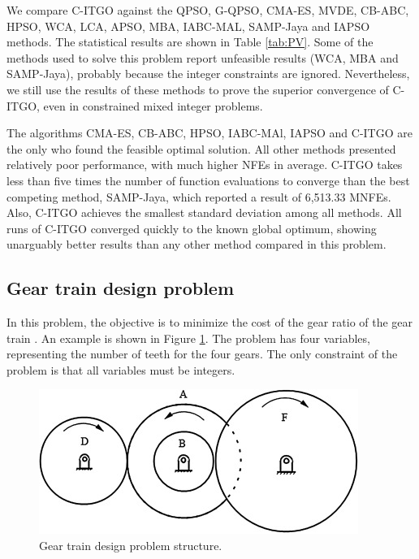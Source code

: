 


We compare C-ITGO against the  QPSO, G-QPSO, CMA-ES, MVDE, CB-ABC, HPSO, WCA, LCA, APSO, MBA, IABC-MAL, SAMP-Jaya and IAPSO methods. The statistical results are shown in Table \ref{tab:PV}. Some of the methods used to solve this problem report unfeasible results (WCA, MBA and SAMP-Jaya), probably because the integer constraints are ignored. Nevertheless, we still use the results of these methods to prove the superior convergence of C-ITGO, even in constrained mixed integer problems.


The algorithms CMA-ES, CB-ABC, HPSO, IABC-MAl, IAPSO and C-ITGO are the only who found the feasible optimal solution. All other methods presented relatively poor performance, with much higher NFEs in average. C-ITGO takes less than five times the number of function evaluations to converge than the best competing method, SAMP-Jaya, which reported a result of 6,513.33 MNFEs. Also, C-ITGO achieves the smallest standard deviation among all methods. All runs of C-ITGO converged quickly to the known global optimum, showing unarguably better results than any other method compared in this problem.



\subsection{Gear train design problem}

In this problem, the objective is to minimize the cost of the gear ratio of the gear train \citep{PV}. An example is shown in Figure \ref{fig:GT}. The problem has four variables, representing the number of teeth for the four gears. The only constraint of the problem is that all variables must be integers.


\begin{figure}[h]
\begin{center}
\includegraphics[scale=0.6]{Imgs/GT.jpg}
\end{center}
\captionsetup{justification=centering}
\caption{Gear train design problem structure.}\label{fig:GT}
\end{figure}


